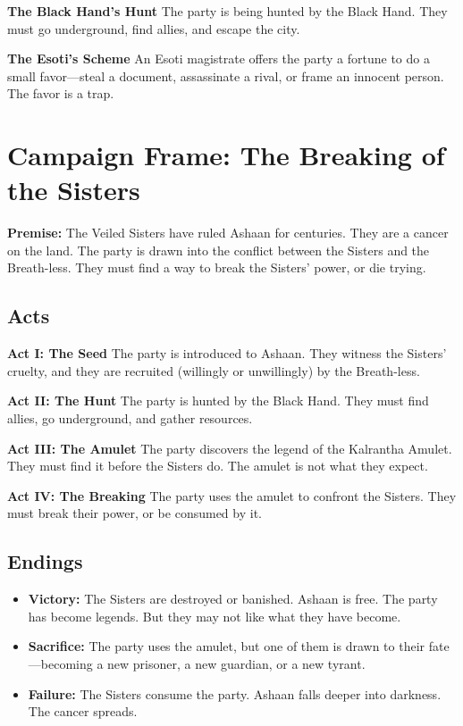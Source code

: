 \documentclass[11pt,twoside]{book}
\newenvironment{adventurebox}{\begin{mdframed}[style=adventurebox]}{\end{mdframed}}
\begin{document}
\begin{adventurebox}
\textbf{The Black Hand's Hunt}
The party is being hunted by the Black Hand. They must go underground, find allies, and escape the city.
\end{adventurebox}

\begin{adventurebox}
\textbf{The Esoti's Scheme}
An Esoti magistrate offers the party a fortune to do a small favor---steal a document, assassinate a rival, or frame an innocent person. The favor is a trap.
\end{adventurebox}

\chapter{Campaign Frame: The Breaking of the Sisters}

\textbf{Premise:} The Veiled Sisters have ruled Ashaan for centuries. They are a cancer on the land. The party is drawn into the conflict between the Sisters and the Breath-less. They must find a way to break the Sisters' power, or die trying.

\section{Acts}

\textbf{Act I: The Seed}
The party is introduced to Ashaan. They witness the Sisters' cruelty, and they are recruited (willingly or unwillingly) by the Breath-less.

\textbf{Act II: The Hunt}
The party is hunted by the Black Hand. They must find allies, go underground, and gather resources.

\textbf{Act III: The Amulet}
The party discovers the legend of the Kalrantha Amulet. They must find it before the Sisters do. The amulet is not what they expect.

\textbf{Act IV: The Breaking}
The party uses the amulet to confront the Sisters. They must break their power, or be consumed by it.

\section{Endings}

\begin{itemize}
    \item \textbf{Victory:} The Sisters are destroyed or banished. Ashaan is free. The party has become legends. But they may not like what they have become.
    \item \textbf{Sacrifice:} The party uses the amulet, but one of them is drawn to their fate---becoming a new prisoner, a new guardian, or a new tyrant.
    \item \textbf{Failure:} The Sisters consume the party. Ashaan falls deeper into darkness. The cancer spreads.
\end{itemize}
\end{document}
